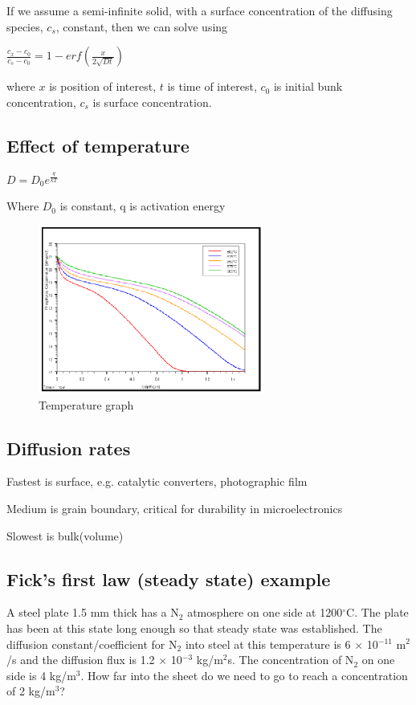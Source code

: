 \documentclass{article}
\begin{document}
If we assume a semi-infinite solid, with a surface concentration of the diffusing species, $c_s$, constant, then we can solve using

$\frac{c_x-c_0}{c_s-c_0} = 1 - erf\left(\frac{x}{2\sqrt{Dt}}\right)$

where $x$ is position of interest, $t$ is time of interest, $c_0$ is initial bunk concentration, $c_s$ is surface concentration.

\subsection{Effect of temperature}

$D = D_0 e^{\frac{q}{kT}}$

Where $D_0$ is constant, q is activation energy

\begin{figure}[h!]
	\centering
	\includegraphics[width=0.66\textwidth]{assets/30d8dd09.png}
    \caption{Temperature graph}
    \label{fig:temp}
\end{figure}

\subsection{Diffusion rates}

Fastest is surface, e.g. catalytic converters, photographic film

Medium is grain boundary, critical for durability in microelectronics

Slowest is bulk(volume)

\subsection{Fick's first law (steady state) example}
A steel plate 1.5 mm thick has a N$_2$ atmosphere on one side at 1200$^\circ$C. The plate has been at this state long enough so that steady state was established. The diffusion constant/coefficient for N$_2$ into steel at this temperature is 6 $\times$ 10$^{-11}$ m$^2$/s and the diffusion flux is 1.2 $\times$ 10$^{-3}$ kg/m$^2$s. The concentration of N$_2$ on one side is 4 kg/m$^3$. How far into the sheet do we need to go to reach a concentration of 2 kg/m$^3$?
\end{document}
